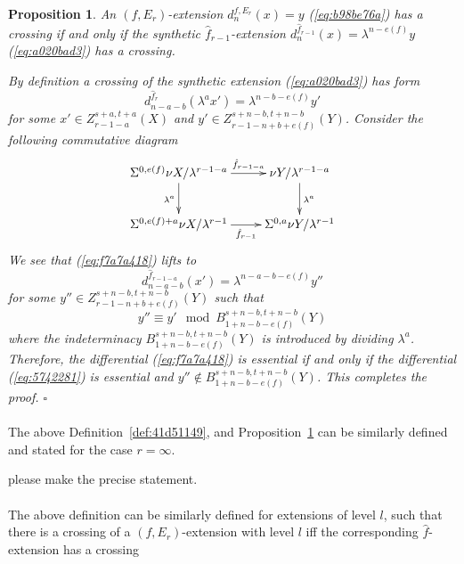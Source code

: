 \documentclass[12pt,a4paper]{article}
\renewenvironment{proof}{{\noindent\it\textbf{Proof}}\quad\it}{\hfill$\square$}
\newtheorem{proposition}[equation]{Proposition}
\newcommand{\Sus}{\Sigma}
\begin{document}
\begin{sloppy}
\begin{proposition}\label{prop:cross-f-Er}
    An $(f,E_r)$-extension $d_{n}^{f,E_r}(x)=y$ (\ref{eq:b98be76a}) has a crossing if and only if the synthetic $\hat f_{r-1}$-extension $d_{n}^{\hat f_{r-1}}(x)=\lambda^{n-e(f)} y$ (\ref{eq:a020bad3}) has a crossing.
\end{proposition}

\begin{proof}
    By definition a crossing of the synthetic extension (\ref{eq:a020bad3}) has form
    \begin{equation}\label{eq:f7a7a418}
        d_{n-a-b}^{\hat f_r}(\lambda^ax')=\lambda^{n-b-e(f)}y'
    \end{equation}
    for some $x'\in Z_{r-1-a}^{s+a,t+a}(X)$ and $y'\in Z_{r-1-n+b+e(f)}^{s+n-b,t+n-b}(Y)$. Consider the following commutative diagram
    $$\xymatrix{
        \Sus^{0,e(f)}\nu X/\lambda^{r-1-a} \ar[r]^-{\hat f_{r-1-a}} \ar[d]_{\lambda^a} & \nu Y/\lambda^{r-1-a} \ar[d]^{\lambda^a}\\
        \Sus^{0,e(f)+a}\nu X/\lambda^{r-1}\ar[r]_-{\hat f_{r-1}} & \Sus^{0,a}\nu Y/\lambda^{r-1}\\
    }$$
    We see that (\ref{eq:f7a7a418}) lifts to
    \begin{equation}\label{eq:5742281}
        d_{n-a-b}^{\hat f_{r-1-a}}(x')= \lambda^{n-a-b-e(f)}y''
    \end{equation}
    for some $y''\in Z_{r-1-n+b+e(f)}^{s+n-b,t+n-b}(Y)$ such that
    $$y''\equiv y'\mod B_{1+n-b-e(f)}^{s+n-b,t+n-b}(Y)$$
    where the indeterminacy $B_{1+n-b-e(f)}^{s+n-b,t+n-b}(Y)$ is introduced by dividing $\lambda^a$.
    Therefore, the differential (\ref{eq:f7a7a418}) is essential if and only if the differential (\ref{eq:5742281}) is essential and $y''\notin B_{1+n-b-e(f)}^{s+n-b,t+n-b}(Y)$. This completes the proof.
\end{proof}

\paragraph{}
The above Definition~\ref{def:41d51149}, and Proposition~\ref{prop:cross-f-Er} can be similarly defined and stated for the case $r=\infty$.

please make the precise statement.

\paragraph{}
The above definition can be similarly defined for extensions of level $l$, such that there is a crossing of a $(f,E_r)$-extension with level $l$ iff the corresponding $\hat{f}$-extension has a crossing


\end{sloppy}
\end{document}
